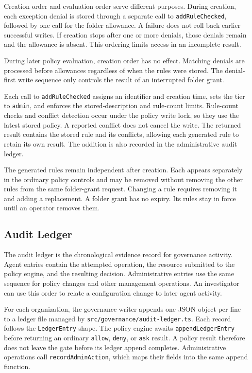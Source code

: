 Creation order and evaluation order serve different purposes. During creation,
each exception denial is stored through a separate call to
\texttt{addRuleChecked}, followed by one call for the folder allowance. A
failure does not roll back earlier successful writes. If creation stops after
one or more denials, those denials remain and the allowance is absent. This
ordering limits access in an incomplete result.

During later policy evaluation, creation order has no effect. Matching denials
are processed before allowances regardless of when the rules were stored. The
denial-first write sequence only controls the result of an interrupted folder
grant.

Each call to \texttt{addRuleChecked} assigns an identifier and creation time,
sets the tier to \texttt{admin}, and enforces the stored-description and
rule-count limits. Rule-count checks and conflict detection occur under the
policy write lock, so they use the latest stored policy. A reported conflict
does not cancel the write. The returned result contains the stored rule and its
conflicts, allowing each generated rule to retain its own result. The addition
is also recorded in the administrative audit ledger.

The generated rules remain independent after creation. Each appears separately
in the ordinary policy controls and may be removed without removing the other
rules from the same folder-grant request. Changing a rule requires removing it
and adding a replacement. {\color{red}A folder grant has no expiry. Its rules
stay in force until an operator removes them.}

\FloatBarrier
\subsection{Audit Ledger}
\label{sec:gov-ledger}

The audit ledger is the chronological evidence record for governance activity.
Agent entries contain the attempted operation, the resource submitted to the
policy engine, and the resulting decision. Administrative entries use the same
sequence for policy changes and other management operations. An investigator
can use this order to relate a configuration change to later agent activity.

For each organization, the governance writer appends one JSON object per line to
a ledger file managed by \texttt{src/governance/audit-ledger.ts}. Each record follows the \texttt{LedgerEntry} shape. The policy engine awaits
\texttt{appendLedgerEntry} before returning an ordinary \texttt{allow},
\texttt{deny}, or \texttt{ask} result. A policy result therefore does not leave
the gate before its ledger append completes. Administrative operations call
\texttt{recordAdminAction}, which maps their fields into the same append
function.

